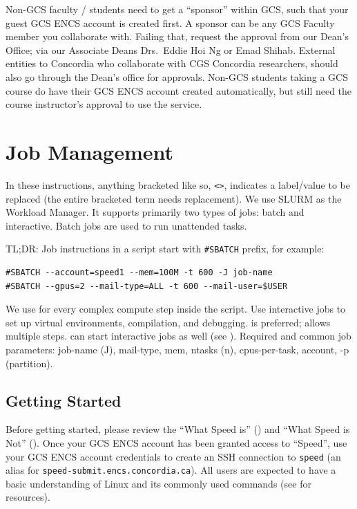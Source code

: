 \documentclass{easychair}
\begin{document}
Non-GCS faculty / students need to get a ``sponsor'' within GCS, such that
your guest GCS ENCS account is created first. A sponsor can be any GCS Faculty member
you collaborate with. Failing that, request the approval from our Dean's Office;
via our Associate Deans Drs.\ Eddie Hoi Ng or Emad Shihab.
%
External entities to Concordia who collaborate with CGS Concordia researchers,
should also go through the Dean's office for approvals.
%
Non-GCS students taking a GCS course do have their GCS ENCS account created automatically,
but still need the course instructor's approval to use the service.

\section{Job Management}
\label{sect:job-management}

In these instructions, anything bracketed like so, \verb+<>+, indicates a
label/value to be replaced (the entire bracketed term needs replacement).
%
We use SLURM as the Workload Manager.
It supports primarily two types of jobs: batch and interactive.
Batch jobs are used to run unattended tasks.

TL;DR:
Job instructions in a script start with \verb+#SBATCH+ prefix, for example:
\begin{verbatim}
#SBATCH --account=speed1 --mem=100M -t 600 -J job-name
#SBATCH --gpus=2 --mail-type=ALL -t 600 --mail-user=$USER
\end{verbatim}
%
We use  for every complex compute step inside the script.
Use interactive jobs to set up virtual environments, compilation, and debugging.
 is preferred; allows multiple steps.
 can start interactive jobs as well (see ).
Required and common job parameters: job-name (J), mail-type, mem, ntasks (n),
cpus-per-task, account, -p (partition).


\subsection{Getting Started}

Before getting started, please review the ``What Speed is'' ()
and ``What Speed is Not'' ().
Once your GCS ENCS account has been granted access to ``Speed'',
use your GCS ENCS account credentials to create an SSH connection to 
\texttt{speed} (an alias for \texttt{speed-submit.encs.concordia.ca}). 
%
All users are expected to have a basic understanding of
Linux and its commonly used commands (see  for resources).
\end{document}
